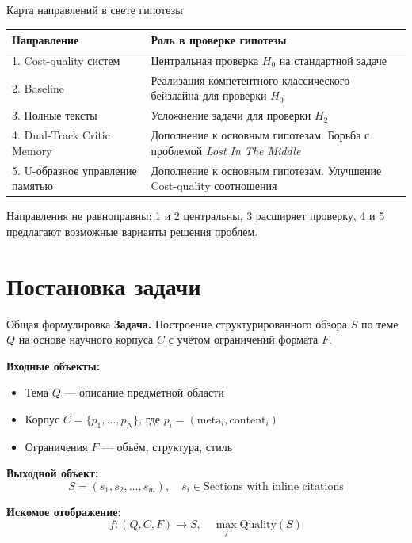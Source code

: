 \documentclass[10pt,aspectratio=169]{beamer}
\begin{document}
\begin{frame}{Карта направлений в свете гипотезы}
  \begin{center}
    \begin{tabular}{p{4cm}|p{8cm}}
      \toprule
      \textbf{Направление} & \textbf{Роль в проверке гипотезы} \\
      \midrule
      1. Cost-quality систем & Центральная проверка $H_0$ на стандартной задаче \\
      \midrule
      2. Baseline & Реализация компетентного классического бейзлайна для проверки $H_0$ \\
      \midrule
      3. Полные тексты & Усложнение задачи для проверки $H_2$ \\
      \midrule
      4. Dual-Track Critic Memory & Дополнение к основным гипотезам. Борьба с проблемой \emph{Lost In The Middle} \\
      \midrule
      5. U-образное управление памятью & Дополнение к основным гипотезам. Улучшение Cost-quality соотношения \\
      \bottomrule
    \end{tabular}
  \end{center}

  \vspace{0.4cm}
  Направления не равноправны: 1 и 2 центральны, 3 расширяет проверку, 4 и 5 предлагают возможные варианты решения проблем.
\end{frame}

\section{Постановка задачи}

\begin{frame}{Общая формулировка}
  \textbf{Задача.} Построение структурированного обзора $S$ по теме $Q$ на основе научного корпуса $C$ с учётом ограничений формата $F$.

  \vspace{0.3cm}
  \textbf{Входные объекты:}
  \begin{itemize}
    \item Тема $Q$ --- описание предметной области
    \item Корпус $C = \{p_1, \ldots, p_N\}$, где $p_i = (\text{meta}_i, \text{content}_i)$
    \item Ограничения $F$ --- объём, структура, стиль
  \end{itemize}

  \vspace{0.3cm}
  \textbf{Выходной объект:}
  \[
    S = (s_1, s_2, \ldots, s_m), \quad s_i \in \text{Sections with inline citations}
  \]

  \vspace{0.3cm}
  \textbf{Искомое отображение:}
  \[
    f: (Q, C, F) \to S, \quad \max_f \text{Quality}(S)
  \]
\end{frame}
\end{document}
